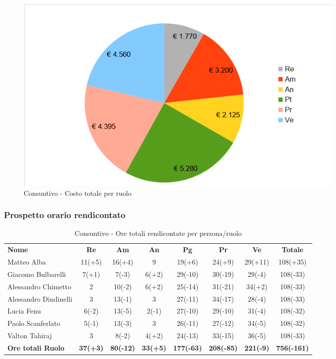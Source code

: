 \begin{figure} [h!]
	\centering
	\includegraphics[width=0.8\textwidth]{res/img/grafici/consuntivo-torta-costo finale.png}
	\caption{Consuntivo - Costo totale per ruolo} 
\end{figure}

\newpage

\subsubsection{Prospetto orario rendicontato}

\begin{table} [h!]
	\begin{center}
		\begin{tabular} { m{3.5cm} c c c c c c c }
			\rowcolor{lightgray}
			\textbf{Nome} & \textbf{Re} & \textbf{Am} & \textbf{An} & \textbf{Pg} & \textbf{Pr} & \textbf{Ve} & \textbf{Totale} \\
			Matteo Alba & 11(+5) & 16(+4) & 9& 19(+6) & 24(+9) & 29(+11) & 108(+35) \\
			Giacomo Bulbarelli &7(+1) & 7(-3) & 6(+2) & 29(-10) & 30(-19) & 29(-4) & 108(-33) \\
			Alessandro Chimetto &2 & 10(-2) & 6(+2) & 25(-14) & 31(-21) & 34(+2) & 108(-33) \\
			Alessandro Dindinelli & 3& 13(-1) & 3 & 27(-11) & 34(-17) & 28(-4) & 108(-33) \\
			Lucia Fenu & 6(-2) & 13(-5) & 2(-1) & 27(-10) & 29(-10) & 31(-4) & 108(-32)\\
			Paolo Scanferlato & 5(-1) & 13(-3) & 3 & 26(-11) & 27(-12) & 34(-5) & 108(-32) \\
			Valton Tahiraj & 3 & 8(-2) & 4(+2) & 24(-13) & 33(-15) & 36(-5) & 108(-33) \\
			\textbf{Ore totali Ruolo} & \textbf{37(+3)} & \textbf{80(-12)} & \textbf{33(+5)} & \textbf{177(-63)} & \textbf{208(-85)}& \textbf{221(-9)} & \textbf{756(-161)}
		\end{tabular}
		\caption{Consuntivo - Ore totali rendicontate per persona/ruolo}
	\end{center}
\end{table}

